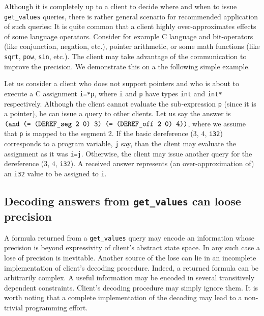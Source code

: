\documentclass[envcountsame]{llncs}
\newcommand{\tmbraw}[3]{(\ensuremath{#1}, \ensuremath{#2}, \texttt{#3})}
\newcommand{\tmb}[3]{\tmbraw{#1}{#2}{#3}}
\begin{document}
Although it is completely up to a client to decide where and when to issue
\texttt{get\_values} queries, there is rather general scenario for recommended
application of such queries: It is quite common that a client highly
over-approximates effects of some language operators. Consider for example C
language and bit-operators (like conjunction, negation, etc.), pointer
arithmetic, or some math functions (like \texttt{sqrt}, \texttt{pow},
\texttt{sin}, etc.). The client may take advantage of the communication to
improve the precision. We demonstrate this on a the following simple example.

Let us consider a client who does not support pointers and who is about to
execute a C assignment \texttt{i=*p}, where \texttt{i} and \texttt{p} have types
\texttt{int} and \texttt{int*} respectively. Although the client cannot evaluate
the  sub-expression \texttt{p} (since it is a pointer), he can issue a query to
other clients. Let us say the answer is $ \texttt{(and (= \deref{2}{0}{seg} 3)
(= \deref{2}{0}{off} 4))}$, where we assume that \texttt{p} is mapped to the
segment 2. If the basic dereference \tmb{3}{4}{i32} corresponds to a program
variable, \texttt{j} say, than the client may evaluate the assignment as it was
\texttt{i=j}. Otherwise, the client may issue another query for the dereference
\tmb{3}{4}{i32}. A received answer represents (an over-approximation of) an
\texttt{i32} value to be assigned to \texttt{i}.


\subsection{Decoding answers from {\tt get\_values} can loose precision}
\label{sec:DecodingGetValues}

A formula returned from a \texttt{get\_values} query may encode an information
whose precision is beyond expressivity of client's abstract state space. In any
such case a lose of precision is inevitable. Another source of the lose can lie
in an incomplete implementation of client's decoding procedure. Indeed, a
returned formula can be arbitrarily complex. A useful information may be encoded
in several transitively dependent constraints. Client's decoding procedure may
simply ignore them. It is worth noting that a complete implementation of the
decoding may lead to a non-trivial programming effort.
\end{document}
